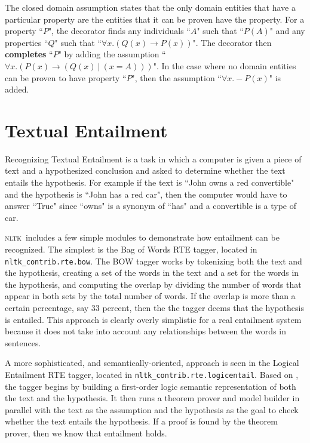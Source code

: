\documentclass[11pt,a4paper]{article}
\newcommand{\NLTK}{\textsc{nltk}}
\newcommand{\dhgcode}[1]{{\tt #1}}
\begin{document}
The closed domain assumption states that the only domain entities that have a particular property are the entities that it can be proven have the property.  For a property ``$P$", the decorator finds any individuals ``$A$" such that ``$P(A)$" and any properties ``$Q$" such that ``$\forall x.(Q(x) \rightarrow P(x))$".  The decorator then \textbf{completes} ``$P$" by adding the assumption ``$\forall x.(P(x) \rightarrow (Q(x)~|~(x = A)))$".  In the case where no domain entities can be proven to have property ``$P$", then the assumption ``$\forall x.-P(x)$" is added.


\section{Textual Entailment}
Recognizing Textual Entailment is a task in which a computer is given a piece of text and a hypothesized conclusion and asked to determine whether the text entails the hypothesis.  For example if the text is ``John owns a red convertible" and the hypothesis is ``John has a red car", then the computer would have to answer ``True" since ``owns" is a synonym of ``has" and a convertible is a type of car.  

\NLTK\ includes a few simple modules to demonstrate how entailment can be recognized.  The simplest is the Bag of Words RTE tagger, located in \dhgcode{nltk\_contrib.rte.bow}.  The BOW tagger works by tokenizing both the text and the hypothesis, creating a set of the words in the text and a set for the words in the hypothesis, and computing the overlap by dividing the number of words that appear in both sets by the total number of words.  If the overlap is more than a certain percentage, say 33 percent, then the the tagger deems that the hypothesis is entailed.  This approach is clearly overly simplistic for a real entailment system because it does not take into account any relationships between the words in sentences.

A more sophisticated, and semantically-oriented, approach is seen in the Logical Entailment RTE tagger, located in \dhgcode{nltk\_contrib.rte.logicentail}.  Based on \cite{BosRTE}, the tagger begins by building a first-order logic semantic representation of both the text and the hypothesis.  It then runs a theorem prover and model builder in parallel with the text as the assumption and the hypothesis as the goal to check whether the text entails the hypothesis.  If a proof is found by the theorem prover, then we know that entailment holds.
\end{document}

